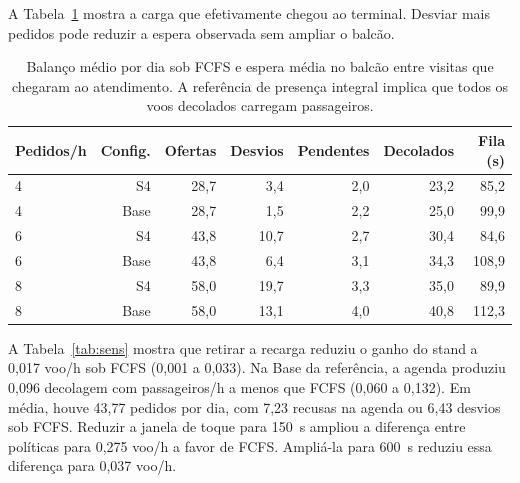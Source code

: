A Tabela~\ref{tab:balance} mostra a carga que efetivamente chegou ao terminal. Desviar mais pedidos pode reduzir a espera observada sem ampliar o balcão.

\begin{table}[htbp]\centering\small
\caption{Balanço médio por dia sob FCFS e espera média no balcão entre visitas que chegaram ao atendimento. A referência de presença integral implica que todos os voos decolados carregam passageiros.}\label{tab:balance}
\begin{tabular}{@{}lrrrrrr@{}}\toprule
Pedidos/h & Config. & Ofertas & Desvios & Pendentes & Decolados & Fila (s) \\\midrule
4 & S4 & 28,7 & 3,4 & 2,0 & 23,2 & 85,2 \\
4 & Base & 28,7 & 1,5 & 2,2 & 25,0 & 99,9 \\
6 & S4 & 43,8 & 10,7 & 2,7 & 30,4 & 84,6 \\
6 & Base & 43,8 & 6,4 & 3,1 & 34,3 & 108,9 \\
8 & S4 & 58,0 & 19,7 & 3,3 & 35,0 & 89,9 \\
8 & Base & 58,0 & 13,1 & 4,0 & 40,8 & 112,3 \\
\bottomrule\end{tabular}\end{table}

A Tabela~\ref{tab:sens} mostra que retirar a recarga reduziu o ganho do stand a 0,017 voo/h sob FCFS (0,001 a 0,033). Na Base da referência, a agenda produziu 0,096 decolagem com passageiros/h a menos que FCFS (0,060 a 0,132). Em média, houve 43,77 pedidos por dia, com 7,23 recusas na agenda ou 6,43 desvios sob FCFS. Reduzir a janela de toque para 150~s ampliou a diferença entre políticas para 0,275 voo/h a favor de FCFS. Ampliá-la para 600~s reduziu essa diferença para 0,037 voo/h.

